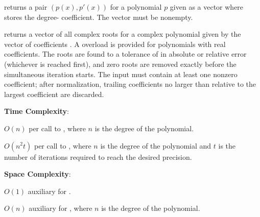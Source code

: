 \begin{compactitem}
  \item {} returns a pair $(p(x), p'(x))$ for a polynomial $p$ given as a vector  where  stores the degree- coefficient. The vector must be nonempty.
  \item {} returns a vector of all complex roots for a complex polynomial given by the vector of coefficients . A  overload is provided for polynomials with real coefficients. The roots are found to a tolerance of  in absolute or relative error (whichever is reached first), and zero roots are removed exactly before the simultaneous iteration starts. The input must contain at least one nonzero coefficient; after normalization, trailing coefficients no larger than  relative to the largest coefficient are discarded.
\end{compactitem}

\textbf{Time Complexity}:
\begin{compactitem}
  \item $O(n)$ per call to , where $n$ is the degree of the polynomial.
  \item $O(n^{2} t)$ per call to , where $n$ is the degree of the polynomial and $t$ is the number of iterations required to reach the desired precision.
\end{compactitem}

\textbf{Space Complexity}:
\begin{compactitem}
  \item $O(1)$ auxiliary for .
  \item $O(n)$ auxiliary for , where $n$ is the degree of the polynomial.
\end{compactitem}

